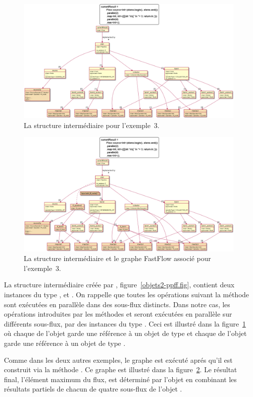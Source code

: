 \begin{figure}
\centering
         \includegraphics[width=1.0\textwidth]{Figures/objets3-ppff.png}
      \caption{La structure interm\'ediaire  pour l'exemple~3.}
       \label{objets3-ppff.fig}
\end{figure}

\begin{figure}
\centering
         \includegraphics[width=1.0\textwidth]{Figures/objets3-ff.png}
      \caption{La structure interm\'ediaire  et le graphe FastFlow associ\'e pour l'exemple~3.}
       \label{objets3-ff.fig}
\end{figure}



La structure interm\'ediaire cr\'e\'ee par , figure~\ref{objets2-ppff.fig}, contient deux instances du type ,  et . On rappelle que toutes les op\'erations suivant la m\'ethode sont ex\'ecut\'ees en parall\`ele dans des sous-flux distincts. Dans notre cas, les op\'erations introduites par les m\'ethodes  et  seront ex\'ecut\'ees en parall\`ele sur diff\'erents sous-flux, par des instances du type . Ceci est illustré dans la figure~\ref{objets3-ppff.fig} o\`u chaque  de l'objet  garde une r\'ef\'erence \`a un objet de type  et chaque  de l'objet  garde une r\'ef\'erence \`a un objet de type . 

Comme dans les deux autres exemples, le graphe  est ex\'ecut\'e apr\'es qu'il est construit via la m\'ethode . Ce graphe est illustré dans la figure~\ref{objets3-ff.fig}. Le r\'esultat final, l'\'el\'ement maximum du flux, est d\'etermin\'e par l'objet  en combinant les r\'esultats partiels de chacun de quatre sous-flux de l'objet .

